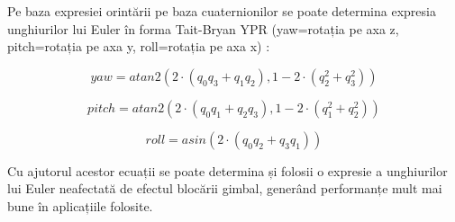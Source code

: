 \-\hspace{1cm}Pe baza expresiei orintării pe baza cuaternionilor se poate determina expresia unghiurilor lui Euler în forma Tait-Bryan YPR (yaw=rotația pe axa z, pitch=rotația pe axa y, roll=rotația pe axa x)
\cite{Mad}:

\begin{equation}
yaw=atan2(2\cdot(q_0q_3+q_1q_2),1-2\cdot(q_2^2+q_3^2))
\end{equation}


\begin{equation}
pitch=atan2(2\cdot(q_0q_1+q_2q_3),1-2\cdot(q_1^2+q_2^2))
\end{equation}

\begin{equation}
roll=asin(2\cdot(q_0q_2+q_3q_1))
\end{equation}

\-\hspace{1cm}Cu ajutorul acestor ecuații se poate determina și folosii o expresie a unghiurilor lui Euler neafectată de efectul blocării gimbal, generând performanțe mult mai bune în aplicațiile folosite.



